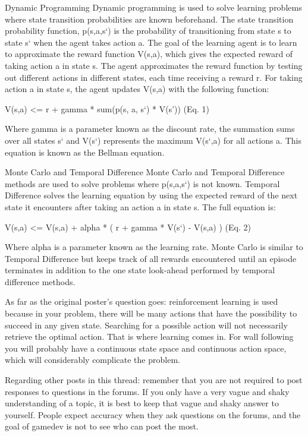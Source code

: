 \documentclass[a4paper,oneside]{report}
\begin{document}
Dynamic Programming
Dynamic programming is used to solve learning problems where state transition probabilities are known beforehand. The state transition probability function, p(s,a,s`) is the probability of transitioning from state s to state s` when the agent takes action a. The goal of the learning agent is to learn to approximate the reward function V(s,a), which gives the expected reward of taking action a in state s. The agent approximates the reward function by testing out different actions in different states, each time receiving a reward r. For taking action a in state s, the agent updates V(s,a) with the following function:

V(s,a) <= r + gamma * sum(p(s, a, s`) * V(s')) (Eq. 1)

Where gamma is a parameter known as the discount rate, the summation sums over all states s` and V(s`) represents the maximum V(s`,a) for all actions a. This equation is known as the Bellman equation.

Monte Carlo and Temporal Difference
Monte Carlo and Temporal Difference methods are used to solve problems where p(s,a,s`) is not known. Temporal Difference solves the learning equation by using the expected reward of the next state it encounters after taking an action a in state s. The full equation is:

V(s,a) <= V(s,a) + alpha * ( r + gamma * V(s`) - V(s,a) ) (Eq. 2)

Where alpha is a parameter known as the learning rate. Monte Carlo is similar to Temporal Difference but keeps track of all rewards encountered until an episode terminates in addition to the one state look-ahead performed by temporal difference methods.

As far as the original poster's question goes: reinforcement learning is used because in your problem, there will be many actions that have the possibility to succeed in any given state. Searching for a possible action will not necessarily retrieve the optimal action. That is where learning comes in. For wall following you will probably have a continuous state space and continuous action space, which will considerably complicate the problem.

Regarding other posts in this thread: remember that you are not required to post responses to questions in the forums. If you only have a very vague and shaky understanding of a topic, it is best to keep that vague and shaky answer to yourself. People expect accuracy when they ask questions on the forums, and the goal of gamedev is not to see who can post the most. 
\end{document}

